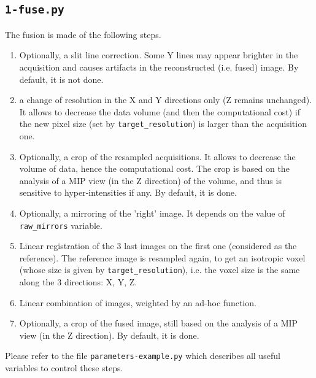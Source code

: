 %
%

\subsection{\texttt{1-fuse.py}}
\label{sec:cli:fuse}

The fusion is made of the following steps.

\begin{enumerate}
\item Optionally, a slit line correction. Some Y lines may appear brighter in the acquisition and causes artifacts in the reconstructed (i.e. fused) image. By default, it is not done.

\item a change of resolution in the X and Y directions only (Z remains unchanged). It allows to decrease the data volume (and then the computational cost) if the new pixel size (set by \verb|target_resolution|) is larger than the acquisition one.

\item \label{it:fusion:crop:1} Optionally, a crop of the resampled acquisitions. It allows to decrease the volume of data, hence the computational cost. The crop is based on the analysis of a MIP view (in the Z direction) of  the volume, and thus is sensitive to hyper-intensities if any. By default, it is done.

\item Optionally, a mirroring of the 'right' image. It depends on the value of  \verb|raw_mirrors| variable.

\item \label{it:fusion:registration} Linear registration of the 3 last images on the first one (considered as the reference). The reference image is resampled again, to get an isotropic voxel (whose size is given by \verb|target_resolution|), i.e. the voxel size is the same along the 3 directions: X, Y, Z.

\item Linear combination of images, weighted by an ad-hoc function.

\item Optionally, a crop of the fused image, still based on the analysis of a MIP view (in the Z direction). By default, it is done.
\end{enumerate}
Please refer to the file \texttt{parameters-example.py} which describes all useful variables to control these steps.



